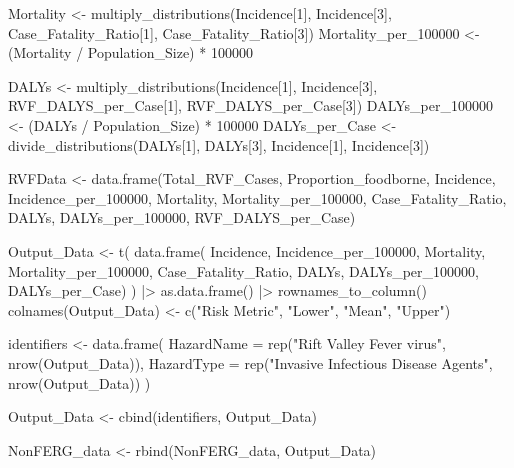 \documentclass[
  letterpaper,
  DIV=11,
  numbers=noendperiod]{scrartcl}
\newenvironment{Shaded}{\begin{snugshade}}{\end{snugshade}}
\newcommand{\AttributeTok}[1]{\textcolor[rgb]{0.40,0.45,0.13}{#1}}
\newcommand{\DecValTok}[1]{\textcolor[rgb]{0.68,0.00,0.00}{#1}}
\newcommand{\FunctionTok}[1]{\textcolor[rgb]{0.28,0.35,0.67}{#1}}
\newcommand{\NormalTok}[1]{\textcolor[rgb]{0.00,0.23,0.31}{#1}}
\newcommand{\OtherTok}[1]{\textcolor[rgb]{0.00,0.23,0.31}{#1}}
\newcommand{\SpecialCharTok}[1]{\textcolor[rgb]{0.37,0.37,0.37}{#1}}
\newcommand{\StringTok}[1]{\textcolor[rgb]{0.13,0.47,0.30}{#1}}
\begin{document}
\begin{Shaded}
\begin{Highlighting}[]
\NormalTok{Mortality }\OtherTok{\textless{}{-}} \FunctionTok{multiply\_distributions}\NormalTok{(Incidence[}\DecValTok{1}\NormalTok{], Incidence[}\DecValTok{3}\NormalTok{],  Case\_Fatality\_Ratio[}\DecValTok{1}\NormalTok{],  Case\_Fatality\_Ratio[}\DecValTok{3}\NormalTok{])}
\NormalTok{Mortality\_per\_100000 }\OtherTok{\textless{}{-}}\NormalTok{ (Mortality }\SpecialCharTok{/}\NormalTok{ Population\_Size) }\SpecialCharTok{*} \DecValTok{100000}

\NormalTok{DALYs }\OtherTok{\textless{}{-}} \FunctionTok{multiply\_distributions}\NormalTok{(Incidence[}\DecValTok{1}\NormalTok{], Incidence[}\DecValTok{3}\NormalTok{],  RVF\_DALYS\_per\_Case[}\DecValTok{1}\NormalTok{],  RVF\_DALYS\_per\_Case[}\DecValTok{3}\NormalTok{])}
\NormalTok{DALYs\_per\_100000 }\OtherTok{\textless{}{-}}\NormalTok{ (DALYs }\SpecialCharTok{/}\NormalTok{ Population\_Size) }\SpecialCharTok{*} \DecValTok{100000}
\NormalTok{DALYs\_per\_Case }\OtherTok{\textless{}{-}} \FunctionTok{divide\_distributions}\NormalTok{(DALYs[}\DecValTok{1}\NormalTok{], DALYs[}\DecValTok{3}\NormalTok{],  Incidence[}\DecValTok{1}\NormalTok{], Incidence[}\DecValTok{3}\NormalTok{])}

\NormalTok{RVFData }\OtherTok{\textless{}{-}} \FunctionTok{data.frame}\NormalTok{(Total\_RVF\_Cases,  Proportion\_foodborne,  Incidence,  Incidence\_per\_100000,  Mortality,  Mortality\_per\_100000,  Case\_Fatality\_Ratio,  DALYs,  DALYs\_per\_100000,  RVF\_DALYS\_per\_Case)}

\NormalTok{Output\_Data }\OtherTok{\textless{}{-}} \FunctionTok{t}\NormalTok{(}
 \FunctionTok{data.frame}\NormalTok{(}
\NormalTok{ Incidence,  Incidence\_per\_100000, }
\NormalTok{ Mortality,  Mortality\_per\_100000, }
\NormalTok{ Case\_Fatality\_Ratio, }
\NormalTok{ DALYs,  DALYs\_per\_100000,  DALYs\_per\_Case)}
\NormalTok{ ) }\SpecialCharTok{|\textgreater{}} 
 \FunctionTok{as.data.frame}\NormalTok{() }\SpecialCharTok{|\textgreater{}} 
 \FunctionTok{rownames\_to\_column}\NormalTok{()}
\FunctionTok{colnames}\NormalTok{(Output\_Data) }\OtherTok{\textless{}{-}} \FunctionTok{c}\NormalTok{(}\StringTok{"Risk Metric"}\NormalTok{,  }\StringTok{"Lower"}\NormalTok{,  }\StringTok{"Mean"}\NormalTok{,  }\StringTok{"Upper"}\NormalTok{)}

\NormalTok{identifiers }\OtherTok{\textless{}{-}} \FunctionTok{data.frame}\NormalTok{(}
 \AttributeTok{HazardName =} \FunctionTok{rep}\NormalTok{(}\StringTok{"Rift Valley Fever virus"}\NormalTok{,  }\FunctionTok{nrow}\NormalTok{(Output\_Data)), }
 \AttributeTok{HazardType =} \FunctionTok{rep}\NormalTok{(}\StringTok{"Invasive Infectious Disease Agents"}\NormalTok{,  }\FunctionTok{nrow}\NormalTok{(Output\_Data))}
\NormalTok{ )}
         

\NormalTok{Output\_Data }\OtherTok{\textless{}{-}} \FunctionTok{cbind}\NormalTok{(identifiers,  Output\_Data)}

\NormalTok{NonFERG\_data }\OtherTok{\textless{}{-}} \FunctionTok{rbind}\NormalTok{(NonFERG\_data,  Output\_Data)}
\end{Highlighting}
\end{Shaded}
\end{document}
